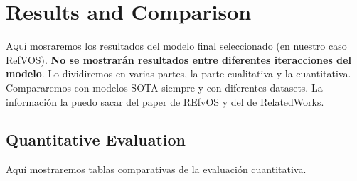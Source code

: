 

\chapter{Results and Comparison}\label{cha:results}



\lettrine{A}{quí} mosraremos los resultados del modelo final seleccionado (en
nuestro caso RefVOS). \textbf{No se mostrarán resultados entre diferentes
  iteracciones del modelo}. Lo dividiremos en varias partes, la parte
cualitativa y la cuantitativa. Compararemos con modelos SOTA siempre y con
diferentes datasets. La información la puedo sacar del paper de REfvOS y del de
RelatedWorks.


\section{Quantitative Evaluation}

Aquí mostraremos tablas comparativas de la evaluación cuantitativa.




\renewcommand{\arraystretch}{1.25}




